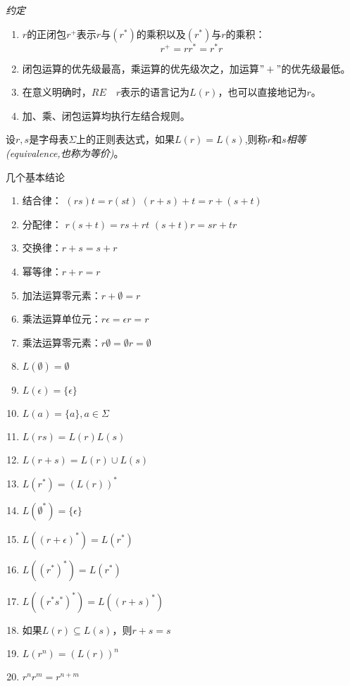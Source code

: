 \emph{约定}
\begin{enumerate}
	\item $r$的正闭包$r^+$表示$r$与$(r^\ast)$的乘积以及$(r^\ast)$与$r$的乘积：
	\[r^+ = rr^\ast = r^\ast r\]
	\item 闭包运算的优先级最高，乘运算的优先级次之，加运算$"+"$的优先级最低。
	\item 在意义明确时，$RE\quad r$表示的语言记为$L(r)$，也可以直接地记为$r$。
	\item 加、乘、闭包运算均执行左结合规则。	
\end{enumerate}

\begin{definition}
	设$r,s$是字母表$\Sigma$上的正则表达式，如果$L(r)=L(s)$,则称$r$和$s$\emph{相等(equivalence,也称为等价)}。
\end{definition}

几个基本结论
\begin{enumerate}
	\item 结合律：
		\subitem $(rs)t=r(st)$
		\subitem $(r+s)+t=r+(s+t)$
	\item 分配律：
		\subitem $r(s+t)=rs+rt$
		\subitem $(s+t)r=sr+tr$
	\item 交换律：$r+s=s+r$
	\item 幂等律：$r+r=r$
	\item 加法运算零元素：$r+\emptyset=r$
	\item 乘法运算单位元：$r\epsilon=\epsilon r=r$
	\item 乘法运算零元素：$r\emptyset=\emptyset r=\emptyset$
	\item $L(\emptyset)=\emptyset$
	\item $L(\epsilon)=\{\epsilon\}$
	\item $L(a)=\{a\}, a\in \Sigma$
	\item $L(rs)=L(r)L(s)$
	\item $L(r+s)=L(r)\cup L(s)$
	\item $L(r^\ast)=(L(r))^\ast$
	\item $L(\emptyset^\ast)=\{\epsilon\}$
	\item $L((r+\epsilon)^\ast)=L(r^\ast)$
	\item $L((r^\ast)^\ast)=L(r^\ast)$
	\item $L((r^\ast s^\ast)^\ast)=L((r+s)^\ast)$
	\item 如果$L(r)\subseteq L(s)$，则$r+s=s$
	\item $L(r^n)=(L(r))^n$
	\item $r^n r^m = r^{n+m}$
\end{enumerate}

